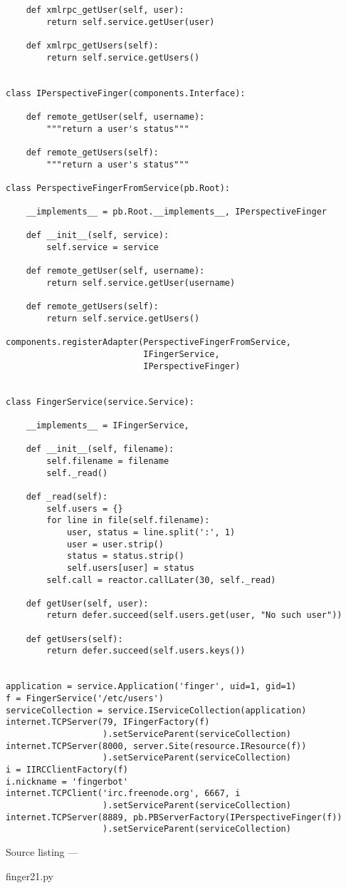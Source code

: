 \begin{verbatim}
    def xmlrpc_getUser(self, user):
        return self.service.getUser(user)

    def xmlrpc_getUsers(self):
        return self.service.getUsers()


class IPerspectiveFinger(components.Interface):

    def remote_getUser(self, username):
        """return a user's status"""

    def remote_getUsers(self):
        """return a user's status"""

class PerspectiveFingerFromService(pb.Root):

    __implements__ = pb.Root.__implements__, IPerspectiveFinger

    def __init__(self, service):
        self.service = service

    def remote_getUser(self, username):
        return self.service.getUser(username)

    def remote_getUsers(self):
        return self.service.getUsers()

components.registerAdapter(PerspectiveFingerFromService,
                           IFingerService,
                           IPerspectiveFinger)


class FingerService(service.Service):

    __implements__ = IFingerService,

    def __init__(self, filename):
        self.filename = filename
        self._read()

    def _read(self):
        self.users = {}
        for line in file(self.filename):
            user, status = line.split(':', 1)
            user = user.strip()
            status = status.strip()
            self.users[user] = status
        self.call = reactor.callLater(30, self._read)

    def getUser(self, user):
        return defer.succeed(self.users.get(user, "No such user"))

    def getUsers(self):
        return defer.succeed(self.users.keys())


application = service.Application('finger', uid=1, gid=1)
f = FingerService('/etc/users')
serviceCollection = service.IServiceCollection(application)
internet.TCPServer(79, IFingerFactory(f)
                   ).setServiceParent(serviceCollection)
internet.TCPServer(8000, server.Site(resource.IResource(f))
                   ).setServiceParent(serviceCollection)
i = IIRCClientFactory(f)
i.nickname = 'fingerbot'
internet.TCPClient('irc.freenode.org', 6667, i
                   ).setServiceParent(serviceCollection)
internet.TCPServer(8889, pb.PBServerFactory(IPerspectiveFinger(f))
                   ).setServiceParent(serviceCollection)
\end{verbatim}\parbox[b]{\linewidth}{\begin{center}Source listing --- \begin{em}finger21.py\end{em}\end{center}}

